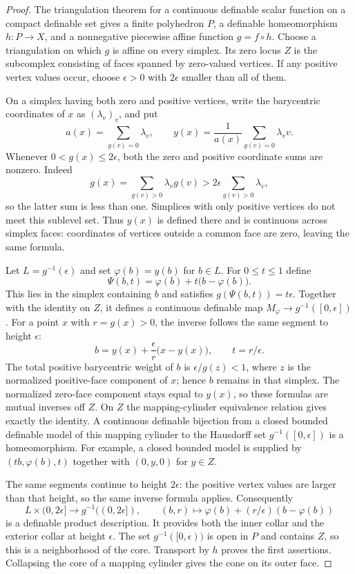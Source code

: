 \begin{proof}
The triangulation theorem for a continuous definable scalar
function on a compact definable set
\cite[Theorem~2.2(1), p.~6]{Shiota2010} gives a finite polyhedron
$P$, a definable homeomorphism $h:P\to X$, and a nonnegative
piecewise affine function $g=f\circ h$.  Choose a triangulation
on which $g$ is affine on every simplex.  Its zero locus $Z$ is
the subcomplex consisting of faces spanned by zero-valued vertices.
If any positive vertex values occur, choose $\epsilon>0$ with
$2\epsilon$ smaller than all of them.

On a simplex having both zero and positive vertices, write the
barycentric coordinates of $x$ as $(\lambda_v)_v$, and put
\[
 a(x)=\sum_{g(v)=0}\lambda_v,
 \qquad
 y(x)=\frac{1}{a(x)}\sum_{g(v)=0}\lambda_vv.
\]
Whenever $0<g(x)\le2\epsilon$, both the zero and positive
coordinate sums are nonzero.  Indeed
\[
 g(x)=\sum_{g(v)>0}\lambda_vg(v)
   >2\epsilon\sum_{g(v)>0}\lambda_v,
\]
so the latter sum is less than one.  Simplices with only positive
vertices do not meet this sublevel set.  Thus $y(x)$ is defined
there and is continuous across simplex faces: coordinates of
vertices outside a common face are zero, leaving the same formula.

Let $L=g^{-1}(\epsilon)$ and set $\varphi(b)=y(b)$ for $b\in L$.
For $0\le t\le1$ define
\[
 \Psi(b,t)=\varphi(b)+t\bigl(b-\varphi(b)\bigr).
\]
This lies in the simplex containing $b$ and satisfies
$g(\Psi(b,t))=t\epsilon$.  Together with the identity on $Z$,
it defines a continuous definable map $M_\varphi\to g^{-1}([0,\epsilon])$.
For a point $x$ with $r=g(x)>0$, the inverse follows the same
segment to height $\epsilon$:
\[
 b=y(x)+\frac{\epsilon}{r}\bigl(x-y(x)\bigr),
 \qquad t=r/\epsilon.
\]
The total positive barycentric weight of $b$ is
$\epsilon/g(z)<1$, where $z$ is the normalized positive-face
component of $x$; hence $b$ remains in that simplex.  The normalized
zero-face component stays equal to $y(x)$, so these formulas are
mutual inverses off $Z$.  On $Z$ the mapping-cylinder equivalence
relation gives exactly the identity.  A continuous definable
bijection from a closed bounded definable model of this mapping
cylinder to the Hausdorff set $g^{-1}([0,\epsilon])$ is a
homeomorphism.  For example, a closed bounded model is supplied
by $(tb,\varphi(b),t)$ together with $(0,y,0)$ for $y\in Z$.

The same segments continue to height $2\epsilon$: the positive
vertex values are larger than that height, so the same inverse
formula applies.  Consequently
\[
 L\times(0,2\epsilon]\longrightarrow g^{-1}((0,2\epsilon]),
 \qquad (b,r)\longmapsto
 \varphi(b)+(r/\epsilon)(b-\varphi(b))
\]
is a definable product description.  It provides both the inner
collar and the exterior collar at height $\epsilon$.
The set $g^{-1}([0,\epsilon))$ is open in $P$ and contains $Z$,
so this is a neighborhood of the core.  Transport by $h$ proves
the first assertions.  Collapsing the core of a mapping cylinder
gives the cone on its outer face.


\end{proof}
